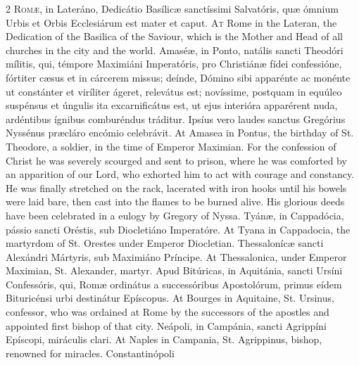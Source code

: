\begin{paracol}{2}
\lettrine[lines=2]{R}{omæ,} in Lateráno, 
 Dedicátio Basílicæ sanctíssimi Salvatóris, quæ ómnium Urbis et Orbis 
 Ecclesiárum est mater et caput.
\switchcolumn
{}
\lettrine[lines=2]{A}{t} Rome in the Lateran, the 
 Dedication of the Basilica of the Saviour, which is the Mother and Head of 
 all churches in the city and the world.
\switchcolumn*
{}
Amaséæ, in Ponto, 
 natális sancti Theodóri mílitis, qui, témpore Maximiáni Imperatóris, pro 
 Christiánæ fídei confessióne, fórtiter cæsus et in cárcerem missus; deínde, 
 Dómino sibi apparénte ac monénte ut constánter et viríliter ágeret, 
 relevátus est; novíssime, postquam in equúleo suspénsus et úngulis ita 
 excarnificátus est, ut ejus interióra apparérent nuda, ardéntibus ígnibus 
 comburéndus tráditur. Ipsíus vero laudes sanctus Gregórius Nyssénus 
 præcláro encómio celebrávit.
\switchcolumn
{}
At Amasea in Pontus, the birthday of 
 St. Theodore, a soldier, in the time of Emperor Maximian. For the 
 confession of Christ he was severely scourged and sent to prison, where he 
 was comforted by an apparition of our Lord, who exhorted him to act with 
 courage and constancy. He was finally stretched on the rack, lacerated 
 with iron hooks until his bowels were laid bare, then cast into the flames 
 to be burned alive. His glorious deeds have been celebrated in a 
 eulogy by Gregory of Nyssa.
\switchcolumn*
{}
Tyánæ, in Cappadócia, pássio sancti Oréstis, sub Diocletiáno Imperatóre.
\switchcolumn
{}
At Tyana in Cappadocia, the 
 martyrdom of St. Orestes under Emperor Diocletian.
\switchcolumn*
{}
Thessalonícæ sancti 
 Alexándri Mártyris, sub Maximiáno Príncipe.
\switchcolumn
{}
At Thessalonica, under Emperor 
 Maximian, St. Alexander, martyr.
\switchcolumn*
{}
Apud Bitúricas, in 
 Aquitánia, sancti Ursíni Confessóris, qui, Romæ ordinátus a successóribus 
 Apostolórum, primus eídem Bituricénsi urbi destinátur Epíscopus.
\switchcolumn
{}
At Bourges in Aquitaine, St. Ursinus, 
 confessor, who was ordained at Rome by the successors of the apostles and 
 appointed first bishop of that city.
\switchcolumn*
{}
Neápoli, in Campánia, sancti Agrippíni Epíscopi, miráculis clari.
\switchcolumn
{}
At Naples in Campania, St. 
 Agrippinus, bishop, renowned for miracles.
\switchcolumn*
{}
Constantinópoli 

\end{paracol}
